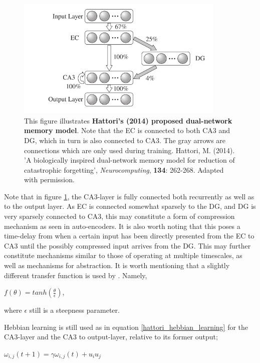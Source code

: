 \begin{figure}
\centering
\includegraphics[width=10cm]{fig/hattori2014_hpc_module}
\caption{This figure illustrates \textbf{Hattori's (2014) proposed dual-network memory model}. Note that the EC is connected to both CA3 and DG, which in turn is also connected to CA3. The gray arrows are connections which are only used during training.
Hattori, M. (2014). 'A biologically inspired dual-network memory model for reduction of catastrophic forgetting', \textit{Neurocomputing}, \textbf{134}: 262-268. Adapted with permission.}
\label{fig:hattori_2014_model}
\end{figure}

Note that in figure \ref{fig:hattori_2014_model}, the CA3-layer is fully connected both recurrently as well as to the output layer. As EC is connected somewhat sparsely to the DG, and DG is very sparsely connected to CA3, this may constitute a form of compression mechanism as seen in auto-encoders. It is also worth noting that this poses a time-delay from when a certain input has been directly presented from the EC to CA3 until the possibly compressed input arrives from the DG. This may further constitute mechanisms similar to those of operating at multiple timescales, as well as mechanisms for abstraction.
It is worth mentioning that a slightly different transfer function is used by \cite{Hattori2014}. Namely,

\begin{center}
    $f(\theta) = tanh(\frac{\theta}{\epsilon})$,
\end{center}
where $\epsilon$ still is a steepness parameter.

Hebbian learning is still used as in equation \ref{hattori_hebbian_learning} for the CA3-layer and the CA3 to output-layer, relative to its former output;

\begin{center}
\begin{math}
    \omega_{i,j}(t+1) = \gamma \omega_{i,j}(t) + u_i u_j
\end{math}
\end{center}

